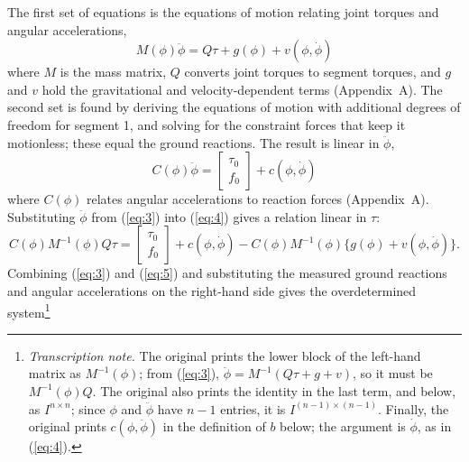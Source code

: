 \documentclass[11pt]{article}
\newcommand{\tnote}[1]{\footnote{\textit{Transcription note.} #1}}
\begin{document}
The first set of equations is the equations of motion relating joint torques
and angular accelerations,
\begin{equation}
M(\phi)\ddot{\phi} = Q\tau + g(\phi) + v(\phi,\dot{\phi})
\label{eq:3}
\end{equation}
where $M$ is the mass matrix, $Q$ converts joint torques to segment torques,
and $g$ and $v$ hold the gravitational and velocity-dependent terms
(Appendix~A). The second set is found by deriving the equations of motion
with additional degrees of freedom for segment 1, and solving for the
constraint forces that keep it motionless; these equal the ground reactions.
The result is linear in $\ddot{\phi}$,
\begin{equation}
C(\phi)\ddot{\phi} = \begin{bmatrix}\tau_0\\ f_0\end{bmatrix}
+ c(\phi,\dot{\phi})
\label{eq:4}
\end{equation}
where $C(\phi)$ relates angular accelerations to reaction forces
(Appendix~A). Substituting $\ddot{\phi}$ from (\ref{eq:3}) into (\ref{eq:4})
gives a relation linear in $\tau$:
\begin{equation}
C(\phi) M^{-1}(\phi) Q\tau
= \begin{bmatrix}\tau_0\\ f_0\end{bmatrix} + c(\phi,\dot{\phi})
- C(\phi) M^{-1}(\phi)\{g(\phi) + v(\phi,\dot{\phi})\}.
\label{eq:5}
\end{equation}
Combining (\ref{eq:3}) and (\ref{eq:5}) and substituting the measured ground
reactions and angular accelerations on the right-hand side gives the
overdetermined system\tnote{The original prints the lower block of the
left-hand matrix as $M^{-1}(\phi)$; from (\ref{eq:3}),
$\ddot{\phi}=M^{-1}(Q\tau+g+v)$, so it must be $M^{-1}(\phi) Q$. The
original also prints the identity in the last term, and below, as
$I^{n\times n}$; since $\phi$ and $\ddot{\phi}$ have $n-1$ entries, it is
$I^{(n-1)\times(n-1)}$. Finally, the original prints $c(\phi,\ddot{\phi})$ in
the definition of $b$ below; the argument is $\dot{\phi}$, as in
(\ref{eq:4}).}
\end{document}
